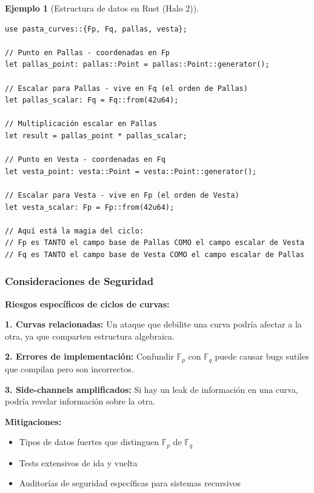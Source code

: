 \documentclass[11pt,a4paper,twoside,openright]{book}
\theoremstyle{definition}
\newtheorem{example}{Ejemplo}[chapter]
\theoremstyle{plain}
\theoremstyle{remark}
\begin{document}
\begin{example}[Estructura de datos en Rust (Halo 2)]
\begin{verbatim}
use pasta_curves::{Fp, Fq, pallas, vesta};

// Punto en Pallas - coordenadas en Fp
let pallas_point: pallas::Point = pallas::Point::generator();

// Escalar para Pallas - vive en Fq (el orden de Pallas)
let pallas_scalar: Fq = Fq::from(42u64);

// Multiplicación escalar en Pallas
let result = pallas_point * pallas_scalar;

// Punto en Vesta - coordenadas en Fq  
let vesta_point: vesta::Point = vesta::Point::generator();

// Escalar para Vesta - vive en Fp (el orden de Vesta)
let vesta_scalar: Fp = Fp::from(42u64);

// Aquí está la magia del ciclo:
// Fp es TANTO el campo base de Pallas COMO el campo escalar de Vesta
// Fq es TANTO el campo base de Vesta COMO el campo escalar de Pallas
\end{verbatim}
\end{example}

\subsubsection{Consideraciones de Seguridad}

\begin{advertencia}
\textbf{Riesgos específicos de ciclos de curvas:}

\textbf{1. Curvas relacionadas:}
Un ataque que debilite una curva podría afectar a la otra, ya que comparten estructura algebraica.

\textbf{2. Errores de implementación:}
Confundir $\mathbb{F}_p$ con $\mathbb{F}_q$ puede causar bugs sutiles que compilan pero son incorrectos.

\textbf{3. Side-channels amplificados:}
Si hay un leak de información en una curva, podría revelar información sobre la otra.

\textbf{Mitigaciones:}
\begin{itemize}
    \item Tipos de datos fuertes que distinguen $\mathbb{F}_p$ de $\mathbb{F}_q$
    \item Tests extensivos de ida y vuelta
    \item Auditorías de seguridad específicas para sistemas recursivos
\end{itemize}
\end{advertencia}
\end{document}
